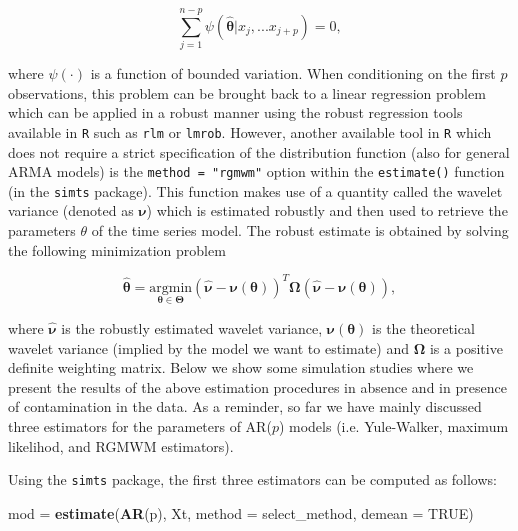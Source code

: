 \documentclass[]{book}
\newenvironment{Shaded}{\begin{snugshade}}{\end{snugshade}}
\newcommand{\KeywordTok}[1]{\textcolor[rgb]{0.13,0.29,0.53}{\textbf{#1}}}
\newcommand{\DataTypeTok}[1]{\textcolor[rgb]{0.13,0.29,0.53}{#1}}
\newcommand{\StringTok}[1]{\textcolor[rgb]{0.31,0.60,0.02}{#1}}
\newcommand{\OtherTok}[1]{\textcolor[rgb]{0.56,0.35,0.01}{#1}}
\newcommand{\NormalTok}[1]{#1}
\theoremstyle{definition}
\theoremstyle{definition}
\theoremstyle{definition}
\theoremstyle{remark}
\begin{document}
\begin{equation*}
\sum_{j=1}^{n-p} \psi (\hat{\mathbf{\theta}}|x_j,...x_{j+p}) = 0,
\end{equation*}

where \(\psi(\cdot)\) is a function of bounded variation. When
conditioning on the first \(p\) observations, this problem can be
brought back to a linear regression problem which can be applied in a
robust manner using the robust regression tools available in \texttt{R}
such as \texttt{rlm} or \texttt{lmrob}. However, another available tool
in \texttt{R} which does not require a strict specification of the
distribution function (also for general ARMA models) is the
\texttt{method\ =\ "rgmwm"} option within the \texttt{estimate()}
function (in the \texttt{simts} package). This function makes use of a
quantity called the wavelet variance (denoted as \(\boldsymbol{\nu}\))
which is estimated robustly and then used to retrieve the parameters
\(\theta\) of the time series model. The robust estimate is obtained by
solving the following minimization problem

\begin{equation*}
\hat{\boldsymbol{\theta}} = \underset{\boldsymbol{\theta} \in \boldsymbol{\Theta}}{\text{argmin}} (\hat{\boldsymbol{\nu}} - \boldsymbol{\nu}(\boldsymbol{\theta}))^T\boldsymbol{\Omega}(\hat{\boldsymbol{\nu}} - \boldsymbol{\nu}({\boldsymbol{\theta}})),
\end{equation*}

where \(\hat{\boldsymbol{\nu}}\) is the robustly estimated wavelet
variance, \(\boldsymbol{\nu}({\boldsymbol{\theta}})\) is the theoretical
wavelet variance (implied by the model we want to estimate) and
\(\boldsymbol{\Omega}\) is a positive definite weighting matrix. Below
we show some simulation studies where we present the results of the
above estimation procedures in absence and in presence of contamination
in the data. As a reminder, so far we have mainly discussed three
estimators for the parameters of AR(\(p\)) models (i.e. Yule-Walker,
maximum likelihod, and RGMWM estimators).

Using the \texttt{simts} package, the first three estimators can be
computed as follows:

\begin{Shaded}
\begin{Highlighting}[]
\NormalTok{mod =}\StringTok{ }\KeywordTok{estimate}\NormalTok{(}\KeywordTok{AR}\NormalTok{(p), Xt, }\DataTypeTok{method =}\NormalTok{ select_method, }\DataTypeTok{demean =} \OtherTok{TRUE}\NormalTok{)}
\end{Highlighting}
\end{Shaded}
\end{document}
